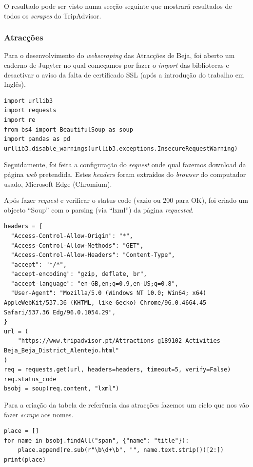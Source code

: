\documentclass[a4paper,10pt]{article}
\begin{document}
O resultado pode ser visto numa secção seguinte que mostrará resultados de todos os \textit{scrapes} do TripAdvisor.

\newpage

\subsubsection{Atracções}

Para o desenvolvimento do \textit{webscraping} das Atracções de Beja, foi aberto um caderno de Jupyter no qual começamos por fazer o \textit{import} das bibliotecas e desactivar o aviso da falta de certificado SSL (após a introdução do trabalho em Inglês).

\begin{verbatim}
import urllib3
import requests
import re
from bs4 import BeautifulSoup as soup
import pandas as pd
urllib3.disable_warnings(urllib3.exceptions.InsecureRequestWarning)
\end{verbatim}

Seguidamente, foi feita a configuração do \textit{request} onde qual fazemos download da página \textit{web} pretendida. Estes \textit{headers} foram extraídos do \textit{browser} do computador usado, Microsoft Edge (Chromium).

Após fazer \textit{request} e verificar o status code (vazio ou 200 para OK), foi criado um objecto ``Soup'' com o parsing (via ``lxml'') da página \textit{requested}.

\begin{verbatim}
headers = {
  "Access-Control-Allow-Origin": "*",
  "Access-Control-Allow-Methods": "GET",
  "Access-Control-Allow-Headers": "Content-Type",
  "accept": "*/*",
  "accept-encoding": "gzip, deflate, br",
  "accept-language": "en-GB,en;q=0.9,en-US;q=0.8",
  "User-Agent": "Mozilla/5.0 (Windows NT 10.0; Win64; x64) AppleWebKit/537.36 (KHTML, like Gecko) Chrome/96.0.4664.45 Safari/537.36 Edg/96.0.1054.29",
}
url = (
    "https://www.tripadvisor.pt/Attractions-g189102-Activities-Beja_Beja_District_Alentejo.html"
)
req = requests.get(url, headers=headers, timeout=5, verify=False)
req.status_code
bsobj = soup(req.content, "lxml")
\end{verbatim}

Para a criação da tabela de referência das atracções fazemos um ciclo que nos vão fazer \textit{scrape} aos nomes.

\begin{verbatim}
place = []
for name in bsobj.findAll("span", {"name": "title"}):
    place.append(re.sub(r"\b\d+\b", "", name.text.strip())[2:])
print(place)
\end{verbatim}
\end{document}
